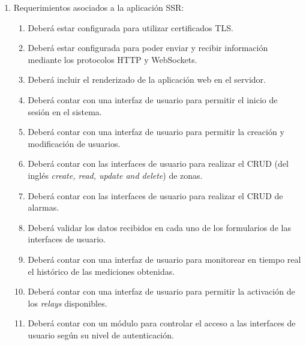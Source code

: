 \begin{enumerate}

	\item Requerimientos asociados a la aplicación SSR:
		\begin{enumerate}
			\item Deberá estar configurada para utilizar certificados TLS.
			\item Deberá estar configurada para poder enviar y recibir información mediante los protocolos HTTP y WebSockets.
			\item Deberá incluir el renderizado de la aplicación web en el servidor.
			\item Deberá contar con una interfaz de usuario para permitir el inicio de sesión en el sistema.
			\item Deberá contar con una interfaz de usuario para permitir la creación y modificación de usuarios.
			\item Deberá contar con las interfaces de usuario para realizar el CRUD (del inglés \textit{create, read, update and delete}) \citep{WEBSITE:CRUD} de zonas.
			\item Deberá contar con las interfaces de usuario para realizar el CRUD de alarmas.
			\item Deberá validar los datos recibidos en cada uno de los formularios de las interfaces de usuario.
			\item Deberá contar con una interfaz de usuario para monitorear en tiempo real el histórico de las mediciones obtenidas.
			\item Deberá contar con una interfaz de usuario para permitir la activación de los \textit{relays} disponibles.
			\item Deberá contar con un módulo para controlar el acceso a las interfaces de usuario según su nivel de autenticación.
		\end{enumerate}
		

\end{enumerate}
